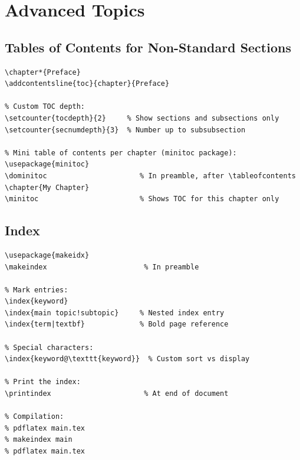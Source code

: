 
\chapter{Advanced Topics}

\section{Tables of Contents for Non-Standard Sections}

\begin{lstlisting}[language={[LaTeX]TeX}, caption=Custom TOC entries]
% Add unnumbered chapter to TOC:
\chapter*{Preface}
\addcontentsline{toc}{chapter}{Preface}

% Custom TOC depth:
\setcounter{tocdepth}{2}     % Show sections and subsections only
\setcounter{secnumdepth}{3}  % Number up to subsubsection

% Mini table of contents per chapter (minitoc package):
\usepackage{minitoc}
\dominitoc                      % In preamble, after \tableofcontents
\chapter{My Chapter}
\minitoc                        % Shows TOC for this chapter only
\end{lstlisting}

\section{Index}

\begin{lstlisting}[language={[LaTeX]TeX}, caption=Index]
\usepackage{makeidx}
\makeindex                       % In preamble

% Mark entries:
\index{keyword}
\index{main topic!subtopic}     % Nested index entry
\index{term|textbf}             % Bold page reference

% Special characters:
\index{keyword@\texttt{keyword}}  % Custom sort vs display

% Print the index:
\printindex                      % At end of document

% Compilation:
% pdflatex main.tex
% makeindex main
% pdflatex main.tex
\end{lstlisting}

